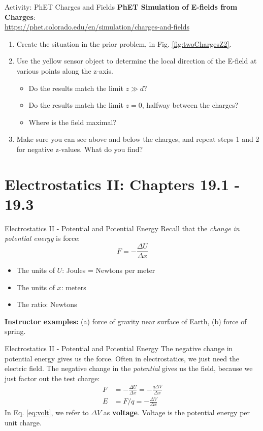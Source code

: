 \documentclass{beamer}
\begin{document}
\begin{frame}{Activity: PhET Charges and Fields}
\textbf{PhET Simulation of E-fields from Charges}: \\ \vspace{0.5cm}
\url{https://phet.colorado.edu/en/simulation/charges-and-fields}
\begin{enumerate}
\item Create the situation in the prior problem, in Fig. \ref{fig:twoChargesZ2}.
\item Use the yellow sensor object to determine the local direction of the E-field at various points along the z-axis.
\begin{itemize}
\item Do the results match the limit $z\gg d$?
\item Do the results match the limit $z = 0$, halfway between the charges?
\item Where is the field maximal?
\end{itemize}
\item Make sure you can see above and below the charges, and repeat steps 1 and 2 for negative z-values.  What do you find?
\end{enumerate}
\end{frame}

\section{Electrostatics II: Chapters 19.1 - 19.3}

\begin{frame}{Electrostatics II - Potential and Potential Energy}
Recall that the \textit{change in potential energy} is force:
\begin{equation}
F = -\frac{\Delta U}{\Delta x}
\end{equation}
\begin{itemize}
\item The units of $U$: Joules = Newtons per meter
\item The units of $x$: meters
\item The ratio: Newtons
\end{itemize}
\textbf{Instructor examples:} (a) force of gravity near surface of Earth, (b) force of spring.
\end{frame}

\begin{frame}{Electrostatics II - Potential and Potential Energy}
The negative change in potential energy gives us the force.  Often in electrostatics, we just need the electric field.  The negative change in the \textit{potential} gives us the field, because we just factor out the test charge:
\begin{align}
F &= -\frac{\Delta U}{\Delta x} =  -\frac{q\Delta V}{\Delta x}\\
E &= F/q = -\frac{\Delta V}{\Delta x} \label{eq:volt}
\end{align}
In Eq. \ref{eq:volt}, we refer to $\Delta V$ as \textbf{voltage}.  Voltage is the potential energy per unit charge.
\end{frame}
\end{document}
